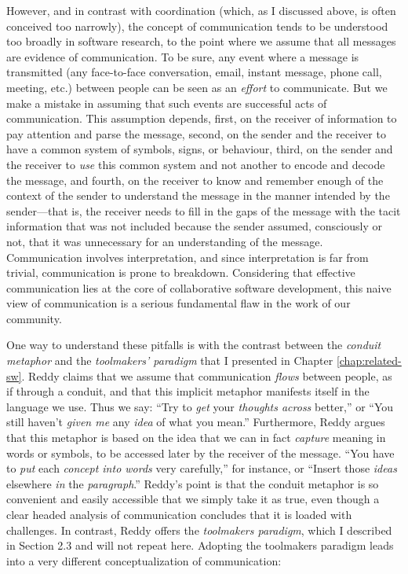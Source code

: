 However, and in contrast with coordination (which, as I discussed above, is often conceived too narrowly), the concept of communication tends to be understood too broadly in software research, to the point where we assume that all messages are evidence of communication. To be sure, any event where a message is transmitted (any face-to-face conversation, email, instant message, phone call, meeting, etc.) between people can be seen as an \emph{effort} to communicate. But we make a mistake in assuming that such events are successful acts of communication. This assumption depends, first, on the receiver of information to pay attention and parse the message, second, on the sender and the receiver to have a common system of symbols, signs, or behaviour, third, on the sender and the receiver to \emph{use} this common system and not another to encode and decode the message, and fourth, on the receiver to know and remember enough of the context of the sender to understand the message in the manner intended by the sender---that is, the receiver needs to fill in the gaps of the message with the tacit information that was not included because the sender assumed, consciously or not, that it was unnecessary for an understanding of the message. Communication involves interpretation, and since interpretation is far from trivial, communication is prone to breakdown. Considering that effective communication lies at the core of collaborative software development, this naive view of communication is a serious fundamental flaw in the work of our community.

One way to understand these pitfalls is with the contrast between the \emph{conduit metaphor} and the \emph{toolmakers' paradigm} \cite{Reddy1993} that I presented in Chapter \ref{chap:related-sw}. Reddy claims that we assume that communication \emph{flows} between people, as if through a conduit, and that this implicit metaphor manifests itself in the language we use. Thus we say: ``Try to \emph{get} your \emph{thoughts across} better,'' or ``You still haven't \emph{given me} any \emph{idea} of what you mean.'' Furthermore, Reddy argues that this metaphor is based on the idea that we can in fact \emph{capture} meaning in words or symbols, to be accessed later by the receiver of the message. ``You have to \emph{put} each \emph{concept into words} very carefully,'' for instance, or ``Insert those \emph{ideas} elsewhere \emph{in} the \emph{paragraph}.'' Reddy's point is that the conduit metaphor is so convenient and easily accessible that we simply take it as true, even though a clear headed analysis of communication concludes that it is loaded with challenges. In contrast, Reddy offers the \emph{toolmakers paradigm}, which I described in Section 2.3 and will not repeat here. Adopting the toolmakers paradigm leads into a very different conceptualization of communication:

